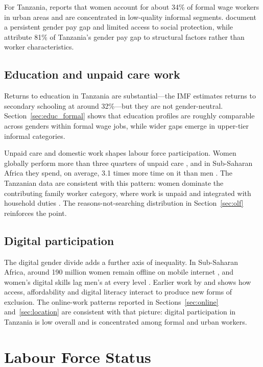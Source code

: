 \documentclass[12pt,a4paper]{article}
\begin{document}
For Tanzania, \citet{opoku2021} reports that women account for about 34\% of formal wage workers in urban areas and are concentrated in low-quality informal segments. \citet{unwomen2024} document a persistent gender pay gap and limited access to social protection, while \citet{vandenbroeck2023} attribute 81\% of Tanzania's gender pay gap to structural factors rather than worker characteristics.

\subsection{Education and unpaid care work}

Returns to education in Tanzania are substantial---the IMF estimates returns to secondary schooling at around 32\%---but they are not gender-neutral. Section~\ref{sec:educ_formal} shows that education profiles are roughly comparable across genders within formal wage jobs, while wider gaps emerge in upper-tier informal categories.

Unpaid care and domestic work shapes labour force participation. Women globally perform more than three quarters of unpaid care \citep{unwomen2015}, and in Sub-Saharan Africa they spend, on average, 3.1 times more time on it than men \citep{worldbank2024}. The Tanzanian data are consistent with this pattern: women dominate the contributing family worker category, where work is unpaid and integrated with household duties \citep{oxfam2020}. The reasons-not-searching distribution in Section~\ref{sec:olf} reinforces the point.

\subsection{Digital participation}

The digital gender divide adds a further axis of inequality. In Sub-Saharan Africa, around 190 million women remain offline on mobile internet \citep{worldbank2022digital}, and women's digital skills lag men's at every level \citep{unesco2023}. Earlier work by \citet{antonio2014} and \citet{mariscal2019} shows how access, affordability and digital literacy interact to produce new forms of exclusion. The online-work patterns reported in Sections~\ref{sec:online} and~\ref{sec:location} are consistent with that picture: digital participation in Tanzania is low overall and is concentrated among formal and urban workers.


\section{Labour Force Status}
\label{sec:lfs}
\end{document}
